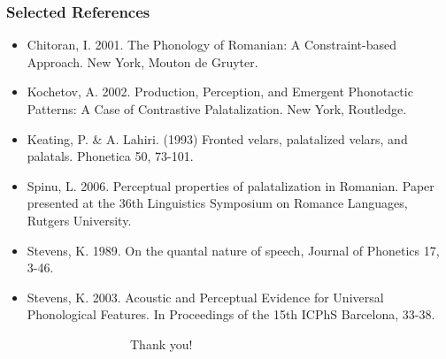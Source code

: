 \documentclass[noamsthm]{beamer}
\begin{document}
\begin{frame}[shrink=5]
\frametitle{Selected References}
\begin{itemize}
\item Chitoran, I. 2001. The Phonology of Romanian: A Constraint-based Approach. New York, Mouton de Gruyter.
\item Kochetov, A. 2002. Production, Perception, and Emergent Phonotactic Patterns: A Case of Contrastive Palatalization.
New York, Routledge.
\item Keating, P. \& A. Lahiri. (1993) Fronted velars, palatalized velars, and palatals. Phonetica 50, 73-101.
\item Spinu, L. 2006. Perceptual properties of palatalization in Romanian. Paper presented at the 36th Linguistics
Symposium on Romance Languages, Rutgers University.
\item Stevens, K. 1989. On the quantal nature of speech, Journal of
Phonetics 17, 3-46.
\item Stevens, K. 2003. Acoustic and Perceptual Evidence for Universal Phonological Features. In Proceedings of the 15th
ICPhS Barcelona, 33-38.
\end{itemize}

\end{frame}

\begin{frame}
~~~~~~~~~~~~~~~~~~~~Thank you!
\end{frame}
\end{document}
